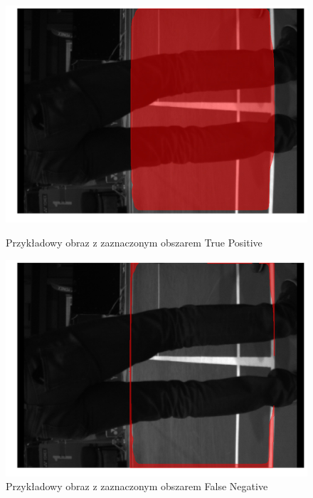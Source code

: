 \begin{figure}[!htb]
    \includegraphics[width=\linewidth]{TP_frame_9.jpg}
    \caption{Przykładowy obraz z zaznaczonym obszarem True Positive}
    \label{fig:TP}
  \endminipage\hfill
    \includegraphics[width=\linewidth]{FN_frame_9.jpg}
    \caption{Przykładowy obraz z zaznaczonym obszarem False Negative}
    \label{fig:FN}
  \endminipage\hfill
\end{figure}

